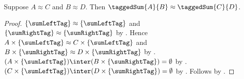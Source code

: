 \begin{theorem}\label{tagged_sum_equinum_congruent}
    Suppose $A\approx C$ and $B\approx D$.
    Then $\taggedSum{A}{B}\approx\taggedSum{C}{D}$.
\end{theorem}
\begin{proof}
    $\{\sumLeftTag\}\approx\{\sumLeftTag\}$ and
        $\{\sumRightTag\}\approx\{\sumRightTag\}$
        by .
    Hence $A\times\{\sumLeftTag\}
            \approx C\times\{\sumLeftTag\}$ and
        $B\times\{\sumRightTag\}
            \approx D\times\{\sumRightTag\}$
        by .
    $(A\times\{\sumLeftTag\})\inter
        (B\times\{\sumRightTag\})=\emptyset$
        by .
    $(C\times\{\sumLeftTag\})\inter
        (D\times\{\sumRightTag\})=\emptyset$
        by .
    Follows by
        .
\end{proof}


